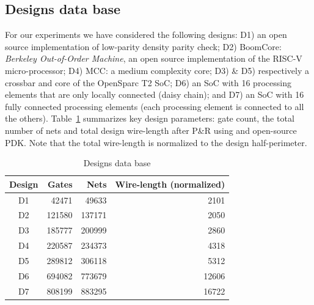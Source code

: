 \documentclass[conference]{IEEEtran}
\begin{document}
\subsection{Designs data base}
For our experiments we have considered the following designs: D1) an open source implementation of low-parity density parity check; D2) BoomCore: \textit{Berkeley Out-of-Order Machine}, an open source implementation of the RISC-V micro-processor; D4) MCC: a medium complexity core; D3) \& D5) respectively a crossbar and core of the OpenSparc T2 SoC;  D6) an SoC with 16 processing elements that are only locally connected (daisy chain); and D7) an SoC with 16 fully connected processing elements (each processing element is connected to all the others). Table~\ref{tab:designs} summarizes key design parameters: gate count, the total number of nets and total design wire-length after P\&R using and open-source PDK. Note that the total wire-length is normalized to the design half-perimeter. 
\begin{table}
\renewcommand{\arraystretch}{1.25}
\caption{Designs data base}
\label{tab:designs}
\centering

\begin{tabular}{||c|r|r|r||}
\hline
Design & Gates  & Nets & Wire-length (normalized)\\
\hline %
D1              &  42471 &  49633 & 2101\\
\hline %
D2              & 121580 & 137171 & 2050\\
\hline %
D3              & 185777 & 200999 & 2860\\
\hline %
D4              & 220587 & 234373 & 4318 \\
\hline %
D5              & 289812 & 306118 & 5312\\
\hline %
D6              & 694082 & 773679 & 12606\\
\hline %
D7              & 808199 & 883295 & 16722\\
\hline
\end{tabular}
\end{table}
\end{document}

